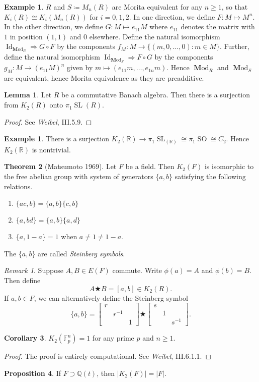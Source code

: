 \documentclass[10pt,letterpaper,cm]{nupset}
\theoremstyle{definition}
\newtheorem{exmp}[definition]{Example}
\theoremstyle{theorem}
\newtheorem{theorem}{Theorem}
\newtheorem{lemma}[theorem]{Lemma}
\newtheorem{prop}[theorem]{Proposition}
\newtheorem{corollary}[theorem]{Corollary}
\theoremstyle{remark}
\newtheorem{remark}{Remark}
\newcommand{\F}{\mathbb F}
\newcommand{\Q}{\mathbb Q}
\newcommand{\R}{\mathbb R}
\newcommand{\1}{\mathbf{1}}
\newcommand{\0}{\vec 0}
\DeclareMathOperator*{\SL}{SL}
\DeclareMathOperator*{\SO}{SO}
\DeclareMathOperator{\id}{Id}
\DeclareMathOperator{\Mod}{\mathbf Mod}
\begin{document}
\begin{exmp}
$R$ and $S\coloneqq M_n(R)$ are Morita equivalent for any $n\geq 1$, so that $K_i(R) \cong K_i(M_n(R))$ for $i=0, 1, 2$. In one direction, we define $F: M \mapsto M^n$. In the other direction, we define $G: M \mapsto e_{11}M$ where $e_11$ denotes the matrix with $1$ in position $(1, 1)$ and $0$ elsewhere. Define the natural isomorphism $\id_{\Mod_R} \Rightarrow G\circ F$ by the components $f_M : M \to \{(m, 0, \ldots, 0) : m \in M\}$. Further, define the natural isomorphism $\id_{\Mod_S} \Rightarrow F\circ G$ by the components  $g_M : M \to (e_{11}M)^n$ given by $m\mapsto (e_{11}m, \ldots, e_{1n}m)$. Hence $\Mod_R$ and $\Mod_S$ are equivalent, hence Morita equivalence as they are preadditive.
\end{exmp}

\begin{lemma}
Let $R$ be a commutative Banach algebra. Then there is a surjection from $K_2(R)$ onto $\pi_1\SL(R)$. 
\end{lemma}
\begin{proof}
See \textit{Weibel}, III.5.9.
\end{proof}

\begin{exmp}
There is a surjection $K_2(\R) \to \pi_1 \SL_(\R) \cong \pi_1\SO \cong C_2$. Hence $K_2(\R)$ is nontrivial.
\end{exmp}

\begin{theorem}[Matsumoto 1969]
Let $F$ be a field. Then $K_2(F)$ is isomorphic to the free abelian group with system of generators $\{a, b\}$  satisfying the following relations.
\begin{enumerate}
\item $\{ac, b\} = \{a, b\}\{c, b\}$
\item $\{a, bd\} = \{a, b\}\{a, d\}$
\item $\{a, 1-a\}=1$ when $a \ne 1 \ne 1-a$.
\end{enumerate}
The $\{a,b\}$ are called \textit{Steinberg symbols}.
\end{theorem}
\begin{remark}
Suppose $A, B \in E(F)$ commute. Write $\phi(a) =A$ and $\phi(b) = B$. Then define $$A \bigstar B =[a,b] \in K_2(R).$$ If $a,b\in F$, we can alternatively define the Steinberg symbol $$\{a, b\} = \begin{bmatrix}
    r & & \\
    & r^{{-}1} & \\
    & & 1
  \end{bmatrix}
 \bigstar
  \begin{bmatrix}
    s & & \\
    & 1 & \\
    & & s^{{-}1}
  \end{bmatrix}
 .$$
\end{remark}

\begin{corollary}
$K_2(\F_p^n) =1$ for any prime $p$ and $n\geq 1$.
\end{corollary}
\begin{proof}
The proof is entirely computational. See \textit{Weibel}, III.6.1.1.
\end{proof}

\begin{prop}
If $F \supset \Q(t)$, then $|K_2(F)| = |F|$.
\end{prop}
\end{document}
